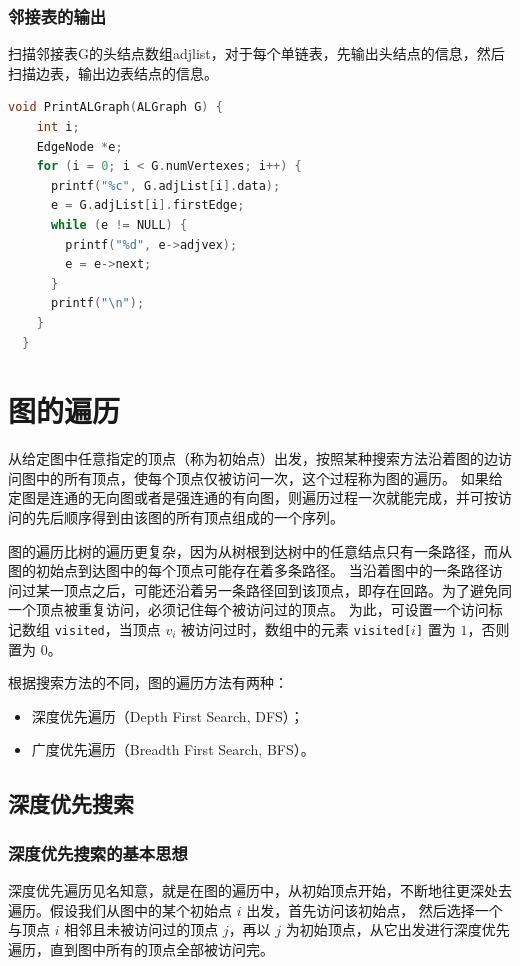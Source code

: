 \documentclass[lang=cn,newtx,10pt,scheme=chinese]{../elegantbook}
\begin{document}
\subsubsection{邻接表的输出}

扫描邻接表G的头结点数组adjlist，对于每个单链表，先输出头结点的信息，然后扫描边表，输出边表结点的信息。
\begin{lstlisting}[language=C++, caption={邻接表的输出}]
  void PrintALGraph(ALGraph G) {
    int i;
    EdgeNode *e;
    for (i = 0; i < G.numVertexes; i++) {
      printf("%c", G.adjList[i].data);
      e = G.adjList[i].firstEdge;
      while (e != NULL) {
        printf("%d", e->adjvex);
        e = e->next;
      }
      printf("\n");
    }
  }
\end{lstlisting}


\section{图的遍历}
从给定图中任意指定的顶点（称为初始点）出发，按照某种搜索方法沿着图的边访问图中的所有顶点，使每个顶点仅被访问一次，这个过程称为图的遍历。
如果给定图是连通的无向图或者是强连通的有向图，则遍历过程一次就能完成，并可按访问的先后顺序得到由该图的所有顶点组成的一个序列。

图的遍历比树的遍历更复杂，因为从树根到达树中的任意结点只有一条路径，而从图的初始点到达图中的每个顶点可能存在着多条路径。
当沿着图中的一条路径访问过某一顶点之后，可能还沿着另一条路径回到该顶点，即存在回路。为了避免同一个顶点被重复访问，必须记住每个被访问过的顶点。
为此，可设置一个访问标记数组 \texttt{visited}，当顶点 $v_i$ 被访问过时，数组中的元素 \texttt{visited[$i$]} 置为 $1$，否则置为 $0$。

根据搜索方法的不同，图的遍历方法有两种：
\begin{itemize}
  \item 深度优先遍历（Depth First Search, DFS）；
  \item 广度优先遍历（Breadth First Search, BFS）。
\end{itemize}
\subsection{深度优先搜索}

\subsubsection{深度优先搜索的基本思想}
深度优先遍历见名知意，就是在图的遍历中，从初始顶点开始，不断地往更深处去遍历。假设我们从图中的某个初始点 $i$ 出发，首先访问该初始点，
然后选择一个与顶点 $i$ 相邻且未被访问过的顶点 $j$，再以 $j$ 为初始顶点，从它出发进行深度优先遍历，直到图中所有的顶点全部被访问完。
\end{document}
